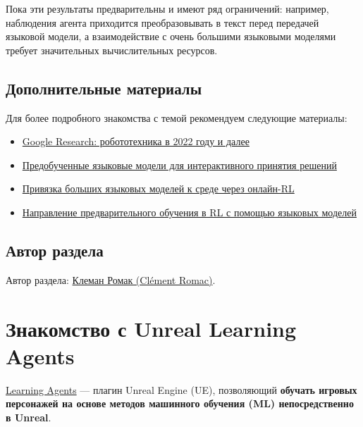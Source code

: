 \documentclass[11pt,a4paper]{article}
\begin{document}

Пока эти результаты предварительны и имеют ряд ограничений: например, наблюдения агента приходится преобразовывать в текст перед передачей языковой модели, а взаимодействие с очень большими языковыми моделями требует значительных вычислительных ресурсов.

\subsection{Дополнительные материалы}\label{further-reading-4}

Для более подробного знакомства с темой рекомендуем следующие материалы:

\begin{itemize}
\item
  \href{https://ai.googleblog.com/2023/02/google-research-2022-beyond-robotics.html}{Google Research: робототехника в 2022 году и далее}
\item
  \href{https://arxiv.org/abs/2202.01771}{Предобученные языковые модели для интерактивного принятия решений}
\item
  \href{https://arxiv.org/abs/2302.02662v1}{Привязка больших языковых моделей к среде через онлайн-RL}
\item
  \href{https://arxiv.org/abs/2302.06692}{Направление предварительного обучения в RL с помощью языковых моделей}
\end{itemize}

\subsection{Автор раздела}\label{author-5}

Автор раздела: \href{https://twitter.com/ClementRomac}{Клеман Ромак (Clément Romac)}.

\section{Знакомство с Unreal Learning Agents}\label{an-introduction-to-unreal-learning-agents}

\href{https://dev.epicgames.com/community/learning/tutorials/8OWY/unreal-engine-learning-agents-introduction}{Learning Agents} --- плагин Unreal Engine (UE), позволяющий \textbf{обучать игровых персонажей на основе методов машинного обучения (ML) непосредственно в Unreal}.
\end{document}

